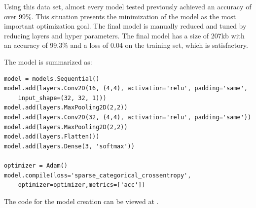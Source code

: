 Using this data set, almost every model tested previously achieved an accuracy of over 99\%.
This situation presents the minimization of the model as the most important optimization goal.
The final model is manually reduced and tuned by reducing layers and hyper parameters.
The final model has a size of 207kb with an accuracy of 99.3\% and a loss of 0.04 on the training set, which is satisfactory.

The model is summarized as:

\begin{lstlisting}[caption={Definition of final model.}]
model = models.Sequential()
model.add(layers.Conv2D(16, (4,4), activation='relu', padding='same',
    input_shape=(32, 32, 1)))
model.add(layers.MaxPooling2D(2,2))
model.add(layers.Conv2D(32, (4,4), activation='relu', padding='same'))
model.add(layers.MaxPooling2D(2,2))
model.add(layers.Flatten())
model.add(layers.Dense(3, 'softmax'))

optimizer = Adam()
model.compile(loss='sparse_categorical_crossentropy',
    optimizer=optimizer,metrics=['acc'])
\end{lstlisting}

The code for the model creation can be viewed at .
